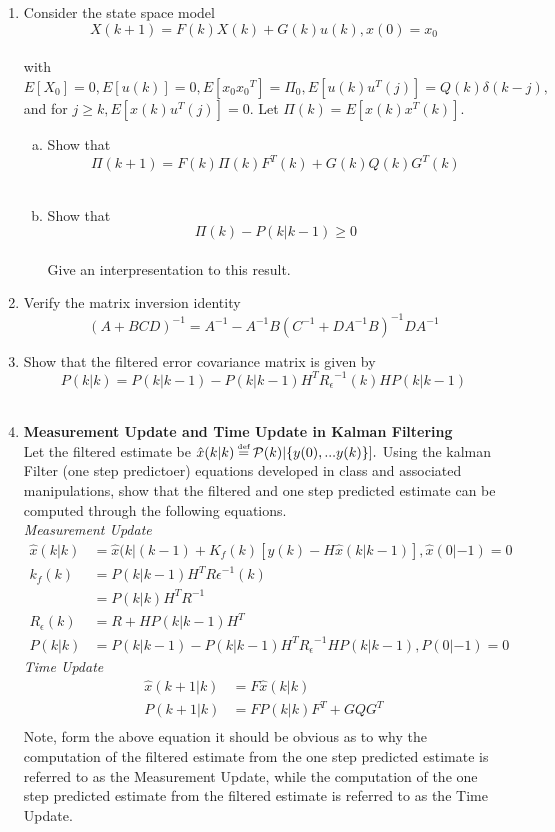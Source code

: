 \documentclass[journal,12pt,twocolumn]{IEEEtran}
\begin{document}
\section{}
\begin{enumerate}
\item Consider the state space model
$$X(k+1)=F(k)X(k)+G(k)u(k),    x(0)=x_{0}$$\\
with $E[X_0]=0, E[u(k)]=0, E[x_{0}{x_{0}}^T]=\Pi_{0}, E[u(k)u^T(j)]=Q(k)\delta(k-j),$ and for $j \geq {k},E[x(k)u^T(j)]=0.$ 
Let $\Pi(k)=E[x(k)x^T(k)].$   
\bigskip
\begin{enumerate}[(a)]
\item Show that\\
$$\Pi(k+1)=F(k)\Pi(k){F^{T}(k)}+G(k)Q(k)G^T(k)$$\\
\bigskip
\item Show that\\
$$\Pi(k)-P(k\vert{k-1})\geq {0}$$\\
\bigskip
Give an interpresentation to this result.
\end{enumerate}
\medskip
\item Verify the matrix inversion identity
$${(A+BCD)^{-1}}=A^{-1}-A^{-1}B{(C^{-1}+D{A^{-1}}B)}^{-1}DA^{-1}$$
\medskip
\item Show that the filtered error covariance matrix is given by\\
\medskip
$$P(k \vert k)=P(k \vert {k-1})-P(k \vert {k-1})H^T{R_\epsilon}^{-1}(k)HP(k \vert {k-1})$$\\
\item \textbf{Measurement Update and Time Update in Kalman Filtering}\\
Let the filtered estimate be ${\hat{x}(k \vert k)}\myeq {\mathcal{P}}(k) \vert \{y(0),... y(k)\}].$ Using the kalman Filter (one step predictoer) equations developed in class and associated manipulations, show that the filtered and one step predicted estimate can be computed through the following equations.\\
\smallskip
\textit{Measurement Update} 
\bigskip
\begin{align*}
\hat{x}(k \vert k )& =\hat{x}(k \vert (k-1)+K_f(k)[y(k)-H\hat{x}(k\vert {k-1})], \hat{x}(0\vert {-1})=0\\
k_f(k)& =P(k\vert{k-1})H^T{R\epsilon}^{-1}(k)\\
&=P(k\vert k)H^TR^{-1}\\
R_\epsilon(k)& =R+HP(k\vert {k-1})H^T\\
P(k\vert k)& =P(k\vert {k-1})-P(k\vert{k-1})H^T{R_\epsilon}^{-1}HP(k\vert {k-1}), P(0\vert {-1})=0
\end{align*}
\textit{Time Update}
\bigskip
\begin{align*}
\hat{x}({k+1}\vert k) &=F{\hat{x}}(k \vert k)\\
P({k+1}\vert k) &=FP(k \vert k)F^T+GQG^T\\
\end{align*}
\medskip
Note, form the above equation it should be obvious as to why the computation of the filtered estimate from the one step predicted estimate is referred to as the Measurement Update, while the computation of the one step predicted estimate from the filtered estimate is referred to as the Time Update. 
\end{enumerate}
\end{document}
